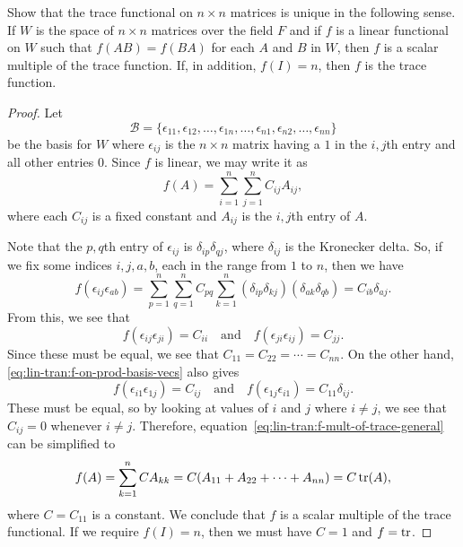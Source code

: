  Show that the trace functional on $n\times n$ matrices
is unique in the following sense. If $W$ is the space of $n\times n$
matrices over the field $F$ and if $f$ is a linear functional on $W$
such that $f(AB) = f(BA)$ for each $A$ and $B$ in $W$, then $f$ is a
scalar multiple of the trace function. If, in addition, $f(I) = n$,
then $f$ is the trace function.
\begin{proof}
  Let
  \begin{equation*}
    \mathcal{B} = \{\epsilon_{11}, \epsilon_{12}, \dots, \epsilon_{1n},
    \dots, \epsilon_{n1}, \epsilon_{n2}, \dots, \epsilon_{nn}\}
  \end{equation*}
  be the basis for $W$ where $\epsilon_{ij}$ is the $n\times n$ matrix
  having a $1$ in the $i,j$th entry and all other entries $0$. Since
  $f$ is linear, we may write it as
  \begin{equation}
    \label{eq:lin-tran:f-mult-of-trace-general}
    f(A) = \sum_{i=1}^n\sum_{j=1}^nC_{ij}A_{ij},
  \end{equation}
  where each $C_{ij}$ is a fixed constant and $A_{ij}$ is the $i,j$th
  entry of $A$.

  Note that the $p,q$th entry of $\epsilon_{ij}$ is
  $\delta_{ip}\delta_{qj}$, where $\delta_{ij}$ is the Kronecker
  delta. So, if we fix some indices $i,j,a,b$, each in the range from
  $1$ to $n$, then we have
  \begin{equation}
    \label{eq:lin-tran:f-on-prod-basis-vecs}
    f(\epsilon_{ij}\epsilon_{ab})
    = \sum_{p=1}^n\sum_{q=1}^nC_{pq}\sum_{k=1}^n(\delta_{ip}\delta_{kj})
      (\delta_{ak}\delta_{qb})
    = C_{ib}\delta_{aj}.
  \end{equation}
  From this, we see that
  \begin{equation*}
    f(\epsilon_{ij}\epsilon_{ji}) = C_{ii} \quad\text{and}\quad
    f(\epsilon_{ji}\epsilon_{ij}) = C_{jj}.
  \end{equation*}
  Since these must be equal, we see that
  $C_{11} = C_{22} = \cdots = C_{nn}$. On the other hand,
  \eqref{eq:lin-tran:f-on-prod-basis-vecs} also gives
  \begin{equation*}
    f(\epsilon_{i1}\epsilon_{1j}) = C_{ij} \quad\text{and}\quad
    f(\epsilon_{1j}\epsilon_{i1}) = C_{11}\delta_{ij}.
  \end{equation*}
  These must be equal, so by looking at values of $i$ and $j$ where
  $i\neq j$, we see that $C_{ij} = 0$ whenever $i\neq j$. Therefore,
  equation~\eqref{eq:lin-tran:f-mult-of-trace-general} can be
  simplified to
  \begin{equation*}
    f(A) = \sum_{k=1}^nCA_{kk}
    = C(A_{11} + A_{22} + \cdots + A_{nn}) = C\operatorname{tr}(A),
  \end{equation*}
  where $C = C_{11}$ is a constant. We conclude that $f$ is a scalar
  multiple of the trace functional. If we require $f(I) = n$, then we
  must have $C = 1$ and $f = \operatorname{tr}$.
\end{proof}
